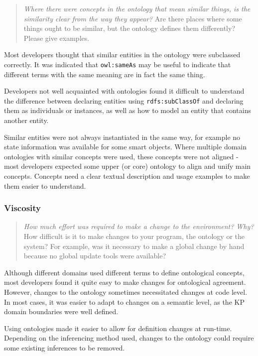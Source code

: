 \begin{quote}
	\emph{Where there were concepts in the ontology that mean similar things, is the similarity clear from the way they appear?}
	Are there places where some things ought to be similar, but the ontology defines them differently? Please give examples.
\end{quote}

Most developers thought that similar entities in the ontology were subclassed correctly. It was indicated that \texttt{owl:sameAs} may be useful to indicate that different terms with the same meaning are in fact the same thing.

Developers not well acquainted with ontologies found it difficult to understand the difference between declaring entities using \texttt{rdfs:sub\-Class\-Of} and declaring them as individuals or instances, as well as how to model an entity that contains another entity.

Similar entities were not always instantiated in the same way, for example no state information was available for some smart objects.
Where multiple domain ontologies with similar concepts were used, these concepts were not aligned - most developers expected some upper (or core) ontology to align and unify main concepts.
Concepts need a clear textual description and usage examples to make them easier to understand.

\subsubsection{Viscosity}

\begin{quote}
	\emph{How much effort was required to make a change to the environment? Why?}
	How difficult is it to make changes to your program, the ontology or the system? For example, was it necessary to make a global change by hand because no global update tools were available?
\end{quote}

Although different domains used different terms to define ontological concepts, most developers found it quite easy to make changes for ontological agreement. However, changes to the ontology sometimes necessitated changes at code level. In most cases, it was easier to adapt to changes on a semantic level, as the \ac{KP} domain boundaries were well defined.

Using ontologies made it easier to allow for definition changes at run-time. Depending on the inferencing method used, changes to the ontology could require some existing inferences to be removed. 

